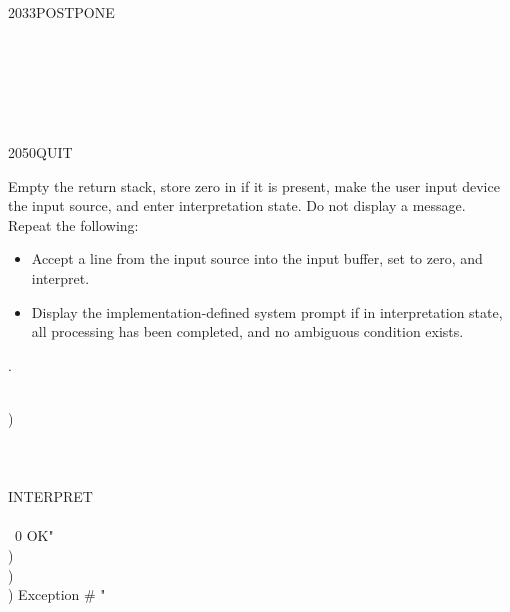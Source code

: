 \begin{worddef}{2033}{POSTPONE}
	\begin{testing} %
		 \\
		 \\

		 \\
		 \\
	\end{testing}
\end{worddef}

\vspace*{-2ex}
\begin{worddef}{2050}{QUIT}
\item \stack{}{}

	Empty the return stack, store zero in  if it is
	present, make the user input device the input source, and enter
	interpretation state. Do not display a message. Repeat the
	following:
	\begin{itemize}
	\item Accept a line from the input source into the input buffer,
		set  to zero, and interpret.
	\item Display the implementation-defined system prompt if in
		interpretation state, all processing has been completed,
		and no ambiguous condition exists.
	\end{itemize}

\see {}.

	\begin{implement} %
		\word{:}  \\
		\tab {}  ) \\
		\tab {} \word{[} \\
		\tab[2]  \\
		\tab {} \\
		\tab[2] \word{[']} INTERPRET  \\
		\tab[2]  \\
		\tab[2] ~0     
			 OK"    \\
		    )  \\
		    )  \\
		\tab[2]   )   Exception \# "  \\
		\tab[2]  \\
		\tab {}  \\
		\word{;}


\end{implement}
\end{worddef}
